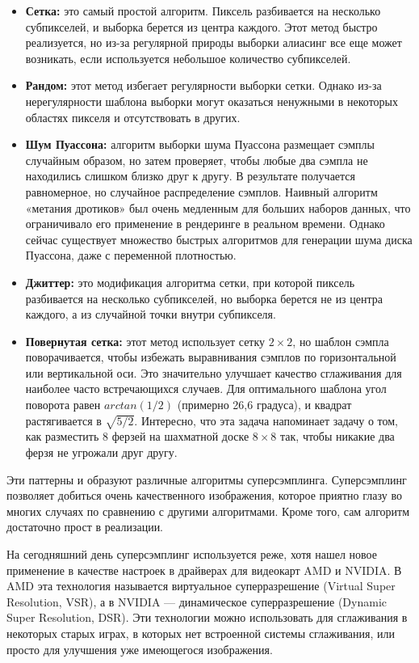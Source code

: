 \begin{itemize}
    \item \textbf{Сетка:} это самый простой алгоритм. Пиксель разбивается на несколько субпикселей, и выборка берется из центра каждого. Этот метод быстро реализуется, но из-за регулярной природы выборки алиасинг все еще может возникать, если используется небольшое количество субпикселей.
    \item \textbf{Рандом:} этот метод избегает регулярности выборки сетки. Однако из-за нерегулярности шаблона выборки могут оказаться ненужными в некоторых областях пикселя и отсутствовать в других.
    \item \textbf{Шум Пуассона:} алгоритм выборки шума Пуассона размещает сэмплы случайным образом, но затем проверяет, чтобы любые два сэмпла не находились слишком близко друг к другу. В результате получается равномерное, но случайное распределение сэмплов. Наивный алгоритм «метания дротиков» был очень медленным для больших наборов данных, что ограничивало его применение в рендеринге в реальном времени. Однако сейчас существует множество быстрых алгоритмов для генерации шума диска Пуассона, даже с переменной плотностью.

    \item \textbf{Джиттер:} это модификация алгоритма сетки, при которой пиксель разбивается на несколько субпикселей, но выборка берется не из центра каждого, а из случайной точки внутри субпикселя.
    \item \textbf{Повернутая сетка:} этот метод использует сетку $2\times2$, но шаблон сэмпла поворачивается, чтобы избежать выравнивания сэмплов по горизонтальной или вертикальной оси. Это значительно улучшает качество сглаживания для наиболее часто встречающихся случаев. Для оптимального шаблона угол поворота равен $arctan(1/2)$ (примерно 26,6 градуса), и квадрат растягивается в $\sqrt{5/2}$. Интересно, что эта задача напоминает задачу о том, как разместить 8 ферзей на шахматной доске $8\times8$ так, чтобы никакие два ферзя не угрожали друг другу.
\end{itemize}

Эти паттерны и образуют различные алгоритмы суперсэмплинга. Суперсэмплинг позволяет добиться очень качественного изображения, которое приятно глазу во многих случаях по сравнению с другими алгоритмами. Кроме того, сам алгоритм достаточно прост в реализации.

На сегодняшний день суперсэмплинг используется реже, хотя нашел новое применение в качестве настроек в драйверах для видеокарт AMD и NVIDIA. В AMD эта технология называется виртуальное суперразрешение (Virtual Super Resolution, VSR), а в NVIDIA — динамическое суперразрешение (Dynamic Super Resolution, DSR). Эти технологии можно использовать для сглаживания в некоторых старых играх, в которых нет встроенной системы сглаживания, или просто для улучшения уже имеющегося изображения.

